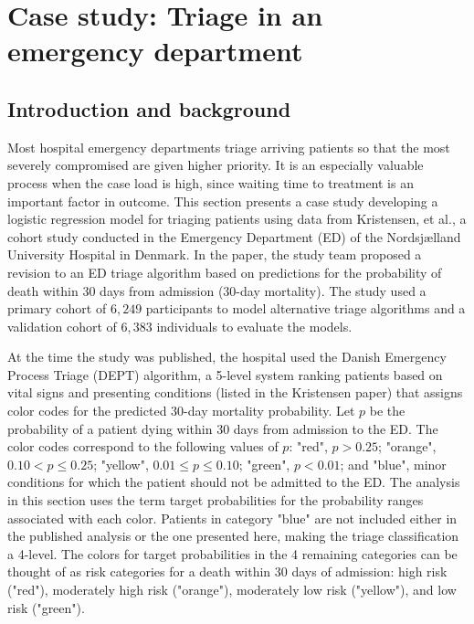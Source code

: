 \section{Case study: Triage in an emergency department}
\label{caseStudy}
\subsection{Introduction and background}
\label{section:IntroDanishED}

Most hospital emergency departments triage arriving patients so that the most severely compromised  are given higher priority. It is an especially valuable process when the case load is high, since waiting time to treatment is an important factor in outcome.  This section presents a case study developing a logistic regression model for triaging patients using data from Kristensen, et al., a cohort study conducted in the Emergency Department (ED) of the Nordsj{\ae}lland University Hospital in Denmark.  In the paper, the study team proposed a revision to an ED triage algorithm based on predictions for the probability of death within 30 days from admission (30-day mortality).  The study used a primary cohort of $6,249$ participants to model alternative triage algorithms and a validation cohort of $6,383$ individuals to evaluate the models.   

At the time the study was published, the hospital used the Danish Emergency Process Triage (DEPT) algorithm, a 5-level system ranking patients based on vital signs and presenting conditions (listed in the Kristensen paper) that assigns color codes for the predicted 30-day mortality probability.  Let $p$ be the probability of a patient dying within 30 days from admission to the ED\@.  The color codes correspond to the following values of $p$: "red", $p > 0.25$; "orange", $0.10 < p \leq 0.25$; "yellow",  $0.01 \leq  p  \leq 0.10$; "green",  $p < 0.01$; and "blue", minor conditions for which the patient should not be admitted to the ED\@. The analysis in this section uses the term target probabilities for the probability ranges associated with each color. Patients in category "blue" are not included either in the published analysis or the one presented here, making the triage classification a 4-level.  The colors for target probabilities in the 4 remaining categories can be thought of as risk categories for a death within 30 days of admission: high risk ("red"), moderately high risk ("orange"), moderately low risk ("yellow"), and low risk ("green").

